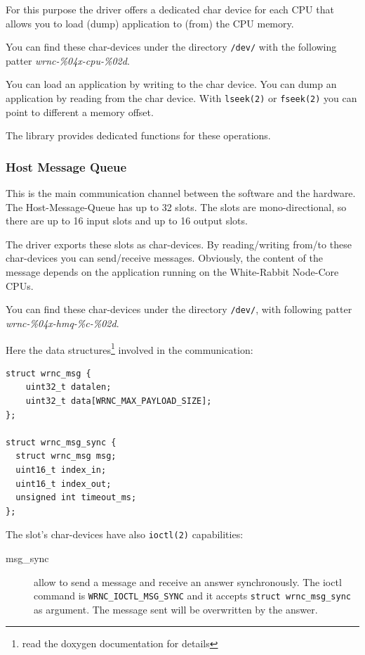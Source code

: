 \documentclass[a4paper,10pt]{article}
\begin{document}
For this purpose the driver offers a dedicated char device for each
CPU that allows you to load (dump) application to (from) the CPU
memory.

You can find these char-devices under the directory \texttt{/dev/} 
with the following patter \textit{wrnc-\%04x-cpu-\%02d}.

You can load an application by writing to the char device. You can
dump an application by reading from the char device. With
\texttt{lseek(2)} or \texttt{fseek(2)} you can point to different
a memory offset.

The library provides dedicated functions for these operations.


\subsubsection{Host Message Queue}%
This is the main communication channel between the software and the
hardware. The Host-Message-Queue has up to 32 slots. The slots are
mono-directional, so there are up to 16 input slots and up to 16
output slots.

The driver exports these slots as char-devices. By reading/writing
from/to these char-devices you can send/receive messages. Obviously,
the content of the message depends on the application running on the
White-Rabbit Node-Core CPUs.

You can find these char-devices under the directory \texttt{/dev/}, 
with following patter \textit{wrnc-\%04x-hmq-\%c-\%02d}.

Here the data structures\footnote{read the doxygen 
documentation for details} involved in the communication:

\begin{lstlisting}
struct wrnc_msg {
	uint32_t datalen;
	uint32_t data[WRNC_MAX_PAYLOAD_SIZE];
};

struct wrnc_msg_sync {
  struct wrnc_msg msg;
  uint16_t index_in;
  uint16_t index_out;
  unsigned int timeout_ms;
};
\end{lstlisting}

The slot's char-devices have also \texttt{ioctl(2)} capabilities:
\begin{description}
  \item[msg\_sync] allow to send a message and receive an answer
    synchronously. The ioctl command is \texttt{WRNC\_IOCTL\_MSG\_SYNC}
    and it accepts \texttt{struct wrnc\_msg\_sync} as argument. The
    message sent will be overwritten by the answer.
\end{description}
\end{document}
